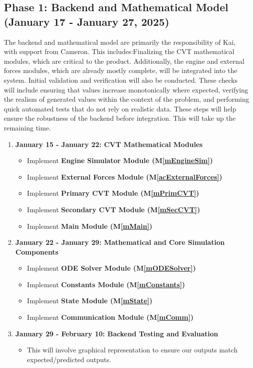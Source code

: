 \documentclass[12pt, titlepage]{article}
\begin{document}
\subsection*{Phase 1: Backend and Mathematical Model (January 17 - January 27, 2025)}
The backend and mathematical model are primarily the responsibility of Kai, with support from Cameron. 
This includes:Finalizing the CVT mathematical modules, which are critical to the product. Additionally, the engine and external forces modules, which are already mostly complete, will be integrated into the system.
Initial validation and verification will also be conducted. These checks will include ensuring that values increase monotonically where expected, verifying the realism of generated values within the context of the problem, and performing quick automated tests that do not rely on realistic data. 
These steps will help ensure the robustness of the backend before integration. This will take up the remaining time.
\begin{enumerate}
    \item \textbf{January 15 - January 22: CVT Mathematical Modules}
    \begin{itemize}
        \item Implement \textbf{Engine Simulator Module (M\ref{mEngineSim})}
        \item Implement \textbf{External Forces Module (M\ref{acExternalForces})}
        \item Implement \textbf{Primary CVT Module (M\ref{mPrimCVT})}
        \item Implement \textbf{Secondary CVT Module (M\ref{mSecCVT})}
        \item Implement \textbf{Main Module (M\ref{mMain})}
    \end{itemize}
    
    \item \textbf{January 22 - January 29: Mathematical and Core Simulation Components}
    \begin{itemize}
        \item Implement \textbf{ODE Solver Module (M\ref{mODESolver})}
        \item Implement \textbf{Constants Module (M\ref{mConstants})}
        \item Implement \textbf{State Module (M\ref{mState})}
        \item Implement \textbf{Communication Module (M\ref{mComm})}
    \end{itemize}

    \item \textbf{January 29 - February 10: Backend Testing and Evaluation}
    \begin{itemize}
      \item This will involve graphical representation to ensure our outputs match expected/predicted outputs.
    \end{itemize}

\end{enumerate}
\end{document}
